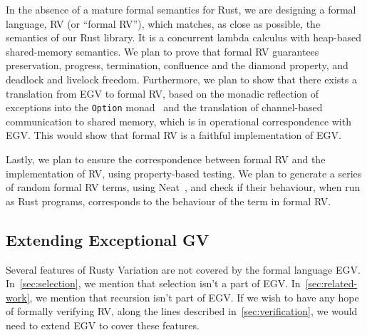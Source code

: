 \documentclass[copyright,creativecommons]{eptcs}
\begin{document}
In the absence of a mature formal semantics for Rust, we are designing a formal language, RV (or ``formal RV''), which matches, as close as possible, the semantics of our Rust library. It is a concurrent lambda calculus with heap-based shared-memory semantics. We plan to prove that formal RV guarantees preservation, progress, termination, confluence and the diamond property, and deadlock and livelock freedom. Furthermore, we plan to show that there exists a translation from EGV to formal RV, based on the monadic reflection of exceptions into the \lstinline{Option} monad~\cite{filinski1994} and the translation of channel-based communication to shared memory, which is in operational correspondence with EGV. This would show that formal RV is a faithful implementation of EGV.

Lastly, we plan to ensure the correspondence between formal RV and the implementation of RV, using property-based testing. We plan to generate a series of random formal RV terms, using Neat~\cite{claessen2015}, and check if their behaviour, when run as Rust programs, corresponds to the behaviour of the term in formal RV.

\subsection{Extending Exceptional GV}
Several features of Rusty Variation are not covered by the formal language EGV. In~\cref{sec:selection}, we mention that selection isn't a part of EGV. In~\cref{sec:related-work}, we mention that recursion isn't part of EGV. If we wish to have any hope of formally verifying RV, along the lines described in~\cref{sec:verification}, we would need to extend EGV to cover these features.

\clearpage


\end{document}
